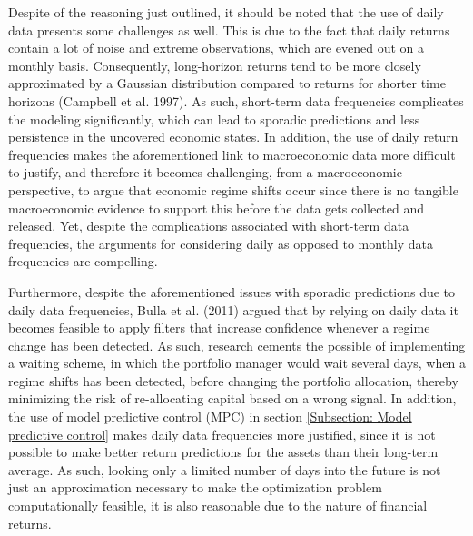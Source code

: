 Despite of the reasoning just outlined, it should be noted that the use of daily data presents some challenges as well. This is due to the fact that daily returns contain a lot of noise and extreme observations, which are evened out on a monthly basis. Consequently, long-horizon returns tend to be more closely approximated by a Gaussian distribution compared to returns for shorter time horizons (Campbell et al. 1997). As such, short-term data frequencies complicates the modeling significantly, which can lead to sporadic predictions and less persistence in the uncovered economic states. In addition, the use of daily return frequencies makes the aforementioned link to macroeconomic data more difficult to justify, and therefore it becomes challenging, from a macroeconomic perspective, to argue that economic regime shifts occur since there is no tangible macroeconomic evidence to support this before the data gets collected and released. Yet, despite the complications associated with short-term data frequencies, the arguments for considering daily as opposed to monthly data frequencies are compelling. 

Furthermore, despite the aforementioned issues with sporadic predictions due to daily data frequencies, Bulla et al. (2011) argued that by relying on daily data it becomes feasible to apply filters that increase confidence whenever a regime change has been detected. As such, research cements the possible of implementing a waiting scheme, in which the portfolio manager would wait several days, when a regime shifts has been detected, before changing the portfolio allocation, thereby minimizing the risk of re-allocating capital based on a wrong signal. In addition, the use of model predictive control (MPC) in section \ref{Subsection: Model predictive control} makes daily data frequencies more justified, since it is not possible to make better return predictions for the assets than their long-term average. As such, looking only a limited number of days into the future is not just an approximation necessary to make the optimization problem computationally feasible, it is also reasonable due to the nature of financial returns.

